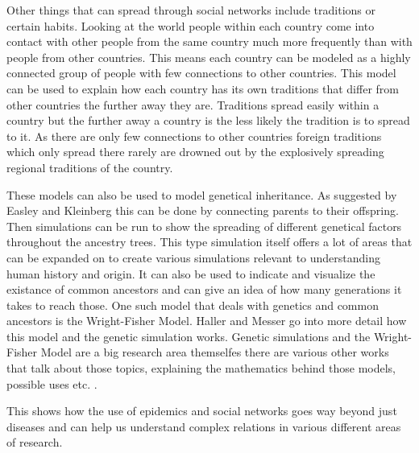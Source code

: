 Other things that can spread through social networks include traditions or certain habits.
Looking at the world people within each country come into contact with other people from the
same country much more frequently than with people from other countries. This means each
country can be modeled as a highly connected group of people with few connections to other
countries. This model can be used to explain how each country has its own traditions that
differ from other countries the further away they are. Traditions spread easily within 
a country but the further away a country is the less likely the tradition is to spread to it.
As there are only few connections to other countries foreign traditions which only spread there
rarely are drowned out by the explosively spreading regional traditions of the country.

These models can also be used to model genetical inheritance. As suggested by
Easley and Kleinberg \cite{networks} this can be done by connecting parents to their offspring.
Then simulations can be run to show the spreading of different genetical factors throughout
the ancestry trees. This type simulation itself offers a lot of areas that can be expanded
on to create various simulations relevant to understanding human history and origin. 
It can also be used to indicate and visualize the existance of common ancestors and 
can give an idea of how many generations it takes to reach those. One such model that deals
with genetics and common ancestors is the Wright-Fisher Model. Haller and Messer \cite{genetics}
go into more detail how this model and the genetic simulation works. Genetic simulations 
and the Wright-Fisher Model are a big research area themselfes there are various other
works that talk about those topics, explaining the mathematics behind those models, 
possible uses etc. \cite{genetics2} \cite{genetics3} \cite{genetics4}.


This shows how the use of epidemics and social networks goes way beyond just diseases and
can help us understand complex relations in various different areas of research.